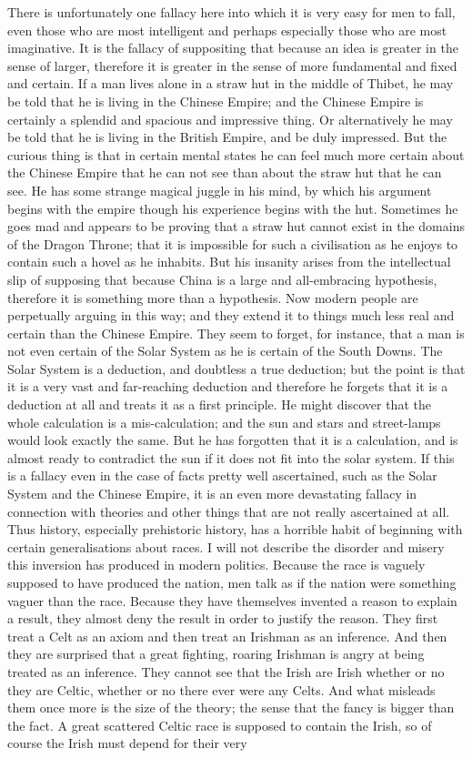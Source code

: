 There is unfortunately one fallacy here into which it is very easy for men to fall, even those who are most intelligent and perhaps especially those who are most imaginative. It is the fallacy of suppositing that because an idea is greater in the sense of larger, therefore it is greater in the sense of more fundamental and fixed and certain. If a man lives alone in a straw hut in the middle of Thibet, he may be told that he is living in the Chinese Empire; and the Chinese Empire is certainly a splendid and spacious and impressive thing. Or alternatively he may be told that he is living in the British Empire, and be duly impressed. But the curious thing is that in certain mental states he can feel much more certain about the Chinese Empire that he can not see than about the straw hut that he can see. He has some strange magical juggle in his mind, by which his argument begins with the empire though his experience begins with the hut. Sometimes he goes mad and appears to be proving that a straw hut cannot exist in the domains of the Dragon Throne; that it is impossible for such a civilisation as he enjoys to contain such a hovel as he inhabits. But his insanity arises from the intellectual slip of supposing that because China is a large and all-embracing hypothesis, therefore it is something more than a hypothesis. Now modern people are perpetually arguing in this way; and they extend it to things much less real and certain than the Chinese Empire. They seem to forget, for instance, that a man is not even certain of the Solar System as he is certain of the South Downs. The Solar System is a deduction, and doubtless a true deduction; but the point is that it is a very vast and far-reaching deduction and therefore he forgets that it is a deduction at all and treats it as a first principle. He might discover that the whole calculation is a mis-calculation; and the sun and stars and street-lamps would look exactly the same. But he has forgotten that it is a calculation, and is almost ready to contradict the sun if it does not fit into the solar system. If this is a fallacy even in the case of facts pretty well ascertained, such as the Solar System and the Chinese Empire, it is an even more devastating fallacy in connection with theories and other things that are not really ascertained at all. Thus history, especially prehistoric history, has a horrible habit of beginning with certain generalisations about races. I will not describe the disorder and misery this inversion has produced in modern politics. Because the race is vaguely supposed to have produced the nation, men talk as if the nation were something vaguer than the race. Because they have themselves invented a reason to explain a result, they almost deny the result in order to justify the reason. They first treat a Celt as an axiom and then treat an Irishman as an inference. And then they are surprised that a great fighting, roaring Irishman is angry at being treated as an inference. They cannot see that the Irish are Irish whether or no they are Celtic, whether or no there ever were any Celts. And what misleads them once more is the size of the theory; the sense that the fancy is bigger than the fact. A great scattered Celtic race is supposed to contain the Irish, so of course the Irish must depend for their very 